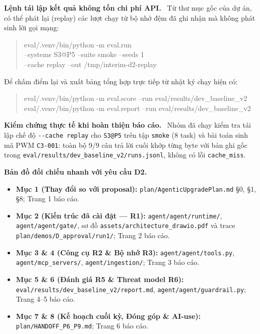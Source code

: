 \documentclass[12pt,a4paper]{report}
\newcommand{\file}[1]{{\small\ttfamily\color{bkblue}\nolinkurl{#1}}}
\newcommand{\subhead}[1]{\par\smallskip\noindent\textbf{#1}\ }
\begin{document}
\subhead{Lệnh tái lập kết quả không tốn chi phí API.} Từ thư mục gốc của dự án, có thể phát lại (replay) các lượt chạy từ bộ nhớ đệm đã ghi nhận mà không phát sinh lời gọi mạng:
\begin{quote}\ttfamily\footnotesize
eval/.venv/bin/python -m eval.run \\
  --systems S3@P5 --suite smoke --seeds 1 \\
  --cache replay --out /tmp/interim-d2-replay
\end{quote}
Để chấm điểm lại và xuất bảng tổng hợp trực tiếp từ nhật ký chạy hiện có:
\begin{quote}\ttfamily\footnotesize
eval/.venv/bin/python -m eval.score  --run eval/results/dev\_baseline\_v2\\
eval/.venv/bin/python -m eval.report --run eval/results/dev\_baseline\_v2
\end{quote}

\subhead{Kiểm chứng thực tế khi hoàn thiện báo cáo.} Nhóm đã chạy kiểm tra tái lập chế độ \file{--cache replay} cho \file{S3@P5} trên tập \file{smoke} (8 task) và bài toán sinh mã PWM \file{C3-001}: toàn bộ 9/9 câu trả lời cuối khớp từng byte với bản ghi gốc trong \file{eval/results/dev_baseline_v2/runs.jsonl}, không có lỗi \file{cache_miss}.

\subhead{Bản đồ đối chiếu nhanh với yêu cầu D2.}
\begin{itemize}
\item \textbf{Mục 1 (Thay đổi so với proposal):} \file{plan/AgenticUpgradePlan.md} §0, §1, §8; Trang 1 báo cáo.
\item \textbf{Mục 2 (Kiến trúc đã cài đặt — R1):} \file{agent/agent/runtime/}, \file{agent/agent/gate/}, sơ đồ \file{assets/architecture_drawio.pdf} và trace \file{plan/demos/D_approval/run1/}; Trang 2 báo cáo.
\item \textbf{Mục 3 \& 4 (Công cụ R2 \& Bộ nhớ R3):} \file{agent/agent/tools.py}, \file{agent/mcp_servers/}, \file{agent/ingestion/}; Trang 3 báo cáo.
\item \textbf{Mục 5 \& 6 (Đánh giá R5 \& Threat model R6):} \file{eval/results/dev_baseline_v2/report.md}, \file{agent/agent/guardrail.py}; Trang 4–5 báo cáo.
\item \textbf{Mục 7 \& 8 (Kế hoạch cuối kỳ, Đóng góp \& AI-use):} \file{plan/HANDOFF_P6_P9.md}; Trang 6 báo cáo.
\end{itemize}
\end{document}
